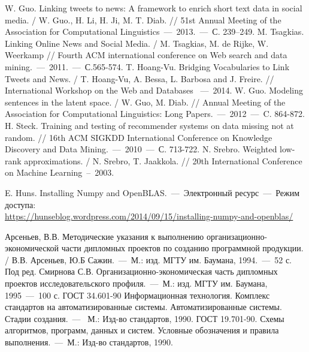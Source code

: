
\begin{thebibliography}{0}
     W. Guo. Linking tweets to news: A framework to enrich short text data in social media. /  W. Guo., H. Li, H. Ji, M. T. Diab.  // 51st Annual Meeting of the Association for Computational Linguistics~---~2013.~---~С. 239–249.
     M. Tsagkias. Linking Online News and Social Media. / M. Tsagkias, M. de Rijke, W. Weerkamp // Fourth ACM international conference on Web search and data mining.~---~2011.~---~С.565-574.
     T. Hoang-Vu. Bridging Vocabularies to Link Tweets and News. / T. Hoang-Vu, A. Bessa, L. Barbosa and J. Freire. // International Workshop on the Web and Databases ~---~2014.
     W. Guo. Modeling sentences in the latent space. / W. Guo, M. Diab. // Annual Meeting of the Association for Computational Linguistics: Long Papers.~---~2012~---~C. 864-872.
     H. Steck. Training and testing of recommender systems on data missing not at random. // 16th ACM SIGKDD International Conference on Knowledge Discovery and Data Mining.~---~2010~---~С. 713-722.
     N. Srebro. Weighted low-rank approximations. / N. Srebro, T. Jaakkola. // 20th International Conference on Machine Learning~--~2003.

     E. Huns. Installing Numpy and OpenBLAS.~---~Электронный ресурс~---~Режим доступа: \\\url{https://hunseblog.wordpress.com/2014/09/15/installing-numpy-and-openblas/}

     Арсеньев, В.В. Методические указания к выполнению организационно-экономической части дипломных проектов по созданию программной продукции. / В.В. Арсеньев, Ю.Б Сажин.~---~М.: изд. МГТУ им. Баумана, 1994.~---~52 с.
     Под ред. Смирнова С.В. Организационно-экономическая часть дипломных проектов исследовательского профиля.~---~М.: изд. МГТУ им. Баумана, 1995~---~100 с.
     ГОСТ 34.601-90 Информационная технология. Комплекс стандартов на автоматизированные системы. Автоматизированные системы. Стадии создания.~---~
     М.: Изд-во стандартов, 1990.
     ГОСТ 19.701-90. Схемы алгоритмов, программ, данных и систем. Условные обозначения и правила выполнения.~---~М.: Изд-во стандартов, 1990.
\end{thebibliography}
